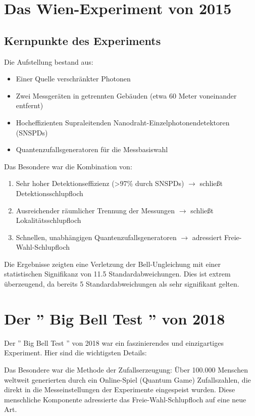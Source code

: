 \documentclass[12pt,a4paper]{article}
\begin{document}
	\section{	Das Wien-Experiment von 2015}
	\subsection{Kernpunkte des Experiments}
	
	Die Aufstellung bestand aus:
	\begin{itemize}
		\item Einer Quelle verschränkter Photonen
		\item Zwei Messgeräten in getrennten Gebäuden (etwa 60 Meter voneinander entfernt)
		\item Hocheffizienten Supraleitenden Nanodraht-Einzelphotonendetektoren (SNSPDs)
		\item Quantenzufallsgeneratoren für die Messbasiswahl
	\end{itemize}
	
	Das Besondere war die Kombination von:
	\begin{enumerate}
		\item Sehr hoher Detektionseffizienz (>97\% durch SNSPDs) $\rightarrow$ schließt Detektionsschlupfloch
		\item Ausreichender räumlicher Trennung der Messungen $\rightarrow$ schließt Lokalitätsschlupfloch
		\item Schnellen, unabhängigen Quantenzufallsgeneratoren $\rightarrow$ adressiert Freie-Wahl-Schlupfloch
	\end{enumerate}
	
	Die Ergebnisse zeigten eine Verletzung der Bell-Ungleichung mit einer statistischen Signifikanz von 11.5 Standardabweichungen. Dies ist extrem überzeugend, da bereits 5 Standardabweichungen als sehr signifikant gelten.
	
	\section{Der '' Big Bell Test '' von 2018}
	
	Der '' Big Bell Test '' von 2018 war ein faszinierendes und einzigartiges Experiment. Hier sind die wichtigsten Details:
	
	Das Besondere war die Methode der Zufallserzeugung: Über 100.000 Menschen weltweit generierten durch ein Online-Spiel (Quantum Game) Zufallszahlen, die direkt in die Messeinstellungen der Experimente eingespeist wurden. Diese menschliche Komponente adressierte das Freie-Wahl-Schlupfloch auf eine neue Art.
	
\end{document}
